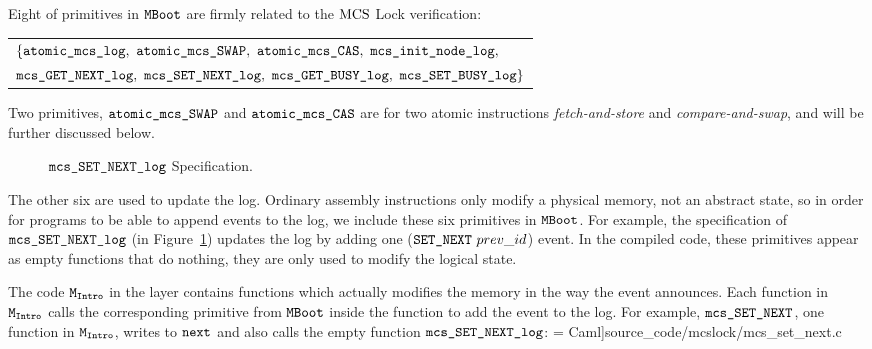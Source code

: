 Eight of  primitives in ${\mathrm{\texttt{MBoot}}}$  are firmly related to the  $\mathrm{MCS}$ Lock verification:

\begin{center}
\begin{tabular}{P{0.95\textwidth}}
$\{\atomicmcslog,\  \atomicmcsswap,\ \atomicmcscas,\ \mcsinitnodelog,$\\
$\mcsgetnextlog,\ \mcssetnextlog,\ \mcsgetbusylog,\ \mcssetbusylog\} $\\
\end{tabular}
\end{center}

Two primitives, ${\mathrm{\texttt{atomic\_mcs\_SWAP}}}$ and ${\mathrm{\texttt{atomic\_mcs\_CAS}}}$ are for  two atomic instructions {\em fetch-and-store} and {\em compare-and-swap}, and will be further discussed below.

\begin{figure}
\begin{center}
 
\end{center}
\caption{${\mathrm{\texttt{mcs\_SET\_NEXT\_log}}}$ Specification.}
\label{fig:chapter:mcslock:specification-of-mcssetnextlog}
\end{figure}

The other six are used to update the log.  
Ordinary assembly instructions only modify a physical memory, not
an abstract state, so in order for programs to be able to append events to
the log, we include these six primitives in ${\mathrm{\texttt{MBoot}}}$. 
For example, the specification of ${\mathrm{\texttt{mcs\_SET\_NEXT\_log}}}$ (in Figure~\ref{fig:chapter:mcslock:specification-of-mcssetnextlog})
updates the log by adding one (${\mathrm{\texttt{SET\_NEXT}}}~{prev\_id}$) event.
In the compiled code, these primitives appear as empty functions that do nothing, they are only used to modify the logical state.

The code ${\mathrm{\texttt{M}}}_{{\mathrm{\texttt{Intro}}}}$ in the layer contains  
functions which actually modifies the memory in the way the event announces.
Each function in ${\mathrm{\texttt{M}}}_{{\mathrm{\texttt{Intro}}}}$ calls the corresponding primitive from
${\mathrm{\texttt{MBoot}}}$ inside the function to add the event to the log.
For example, ${\mathrm{\texttt{mcs\_SET\_NEXT}}}$, one function in ${\mathrm{\texttt{M}}}_{{\mathrm{\texttt{Intro}}}}$, writes
to ${\mathrm{\texttt{next}}}$ and also calls
the empty function ${\mathrm{\texttt{mcs\_SET\_NEXT\_log}}}$:
 = Caml]{source_code/mcslock/mcs_set_next.c}


